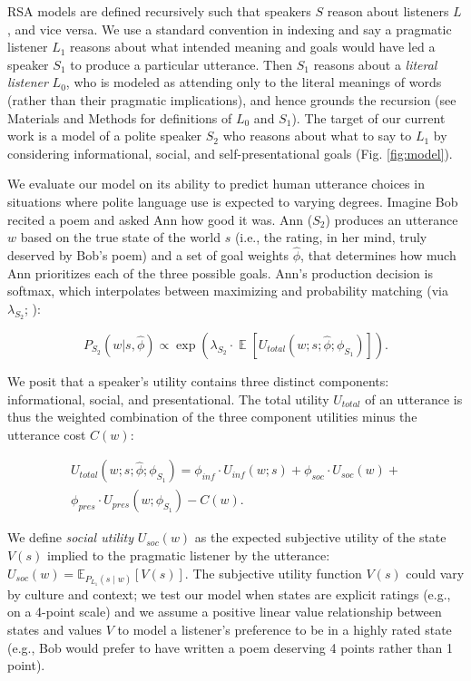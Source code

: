 \documentclass[9pt,twocolumn,twoside,lineno]{main_class_file}
\begin{document}
RSA models are defined recursively such that speakers \(S\)  reason about
listeners  \(L\), and vice versa. We use a standard convention in indexing and say a pragmatic listener \(L_1\) reasons about what intended meaning
and goals would have led a speaker \(S_1\) to produce a particular
utterance. Then \(S_1\) reasons about a \emph{literal listener}
\(L_0\), who is modeled as attending only to the literal meanings of words
(rather than their pragmatic implications), and hence grounds the
recursion (see Materials and Methods for definitions of $L_0$ and $S_1$).
The target of our current work is a model of a polite speaker \(S_2\)
who reasons about what to say to \(L_1\) by
considering informational, social, and self-presentational goals (Fig.
\ref{fig:model}).

We evaluate our model on its ability to predict human utterance choices
in situations where polite language use is expected to varying degrees.
Imagine Bob recited a poem and asked Ann how good it was.
Ann (\(S_2\)) produces an utterance \(w\) based on the true state of the world \(s\) (i.e., the
rating, in her mind, truly deserved by Bob's poem) and a set of goal weights
\(\hat{\phi}\), that determines how much Ann prioritizes each of the three possible goals.
Ann's production decision is softmax, which interpolates between
maximizing and probability matching (via \(\lambda_{S_2}\); \cite{goodman2013}):

\begin{equation}
P_{S_2}(w | s, \hat{\phi}) \propto \exp(\lambda_{S_2} \cdot \mathop{\mathbb{E}}[U_{total}(w; s; \hat{\phi}; \phi_{S_1})]).
\end{equation}

We posit that a speaker's utility contains three distinct components: informational, social, and presentational. The
total utility $U_{total}$ of an utterance is thus the weighted combination of the three component utilities minus the utterance cost \(C(w)\):

\begin{equation}
\begin{split}
U_{total}(w; s; \hat{\phi}; \phi_{S_1}) = \phi_{inf} \cdot U_{inf}(w; s) + \phi_{soc} \cdot U_{soc}(w) + \\ \phi_{pres} \cdot U_{pres}(w; \phi_{S_1}) - C(w).
\end{split}
\end{equation}

We define \emph{social utility} \(U_{soc}(w)\) as the expected subjective utility of the state \(V(s)\) implied to the
pragmatic listener by the utterance: \(U_{soc}(w) = \mathbb{E}_{P_{L_1}(s \mid w)}[V(s)]\).
The subjective utility function \(V(s)\) could vary by culture and context; we test our model when states are explicit ratings (e.g., on a 4-point scale) and we assume a positive linear value relationship between states and values \(V\) to model a listener's preference to be in a highly rated state (e.g., Bob would prefer to have written a poem deserving 4 points rather than 1 point).
\end{document}
